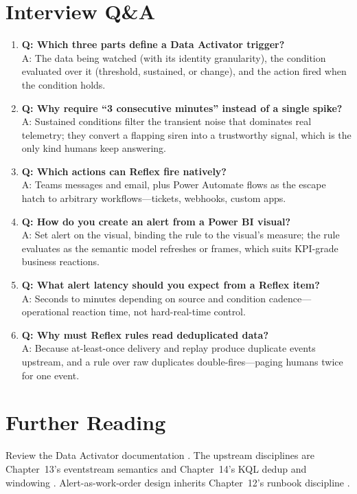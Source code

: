 \section{Interview Q\&A}
\begin{enumerate}
    \item \textbf{Q: Which three parts define a Data Activator trigger?}\\
    A: The data being watched (with its identity granularity), the condition evaluated over it (threshold, sustained, or change), and the action fired when the condition holds.
    \item \textbf{Q: Why require ``3 consecutive minutes'' instead of a single spike?}\\
    A: Sustained conditions filter the transient noise that dominates real telemetry; they convert a flapping siren into a trustworthy signal, which is the only kind humans keep answering.
    \item \textbf{Q: Which actions can Reflex fire natively?}\\
    A: Teams messages and email, plus Power Automate flows as the escape hatch to arbitrary workflows---tickets, webhooks, custom apps.
    \item \textbf{Q: How do you create an alert from a Power BI visual?}\\
    A: Set alert on the visual, binding the rule to the visual's measure; the rule evaluates as the semantic model refreshes or frames, which suits KPI-grade business reactions.
    \item \textbf{Q: What alert latency should you expect from a Reflex item?}\\
    A: Seconds to minutes depending on source and condition cadence---operational reaction time, not hard-real-time control.
    \item \textbf{Q: Why must Reflex rules read deduplicated data?}\\
    A: Because at-least-once delivery and replay produce duplicate events upstream, and a rule over raw duplicates double-fires---paging humans twice for one event.
\end{enumerate}

\section{Further Reading}
Review the Data Activator documentation \cite{microsoftDataActivator}. The upstream disciplines are Chapter~13's eventstream semantics \cite{microsoftFabricEventstreams} and Chapter~14's KQL dedup and windowing \cite{microsoftKQL,microsoftKQLMV}. Alert-as-work-order design inherits Chapter~12's runbook discipline \cite{microsoftFabricMonitoringHub}.

